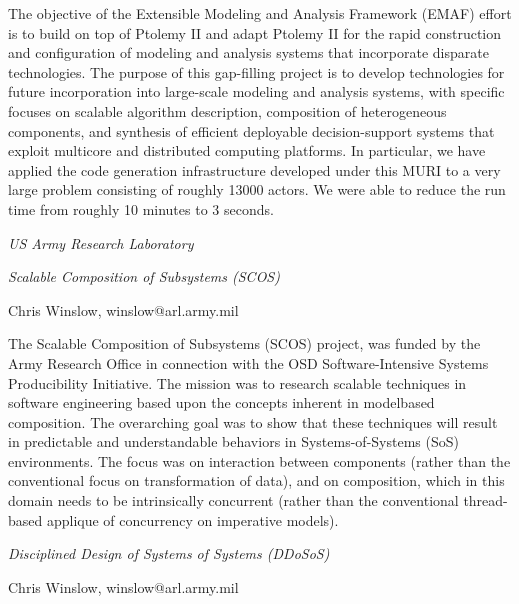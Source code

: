                  The objective of the Extensible Modeling and Analysis Framework (EMAF)
                 effort is to build on top of Ptolemy II and adapt Ptolemy II for the
                 rapid construction and configuration of modeling and analysis systems
                 that incorporate disparate technologies. The purpose of this
                 gap-filling project is to develop technologies for future
                 incorporation into large-scale modeling and analysis systems, with
                 specific focuses on scalable algorithm description, composition of
                 heterogeneous components, and synthesis of efficient deployable
                 decision-support systems that exploit multicore and distributed
                 computing platforms. In particular, we have applied the code
                 generation infrastructure developed under this MURI to a very large
                 problem consisting of roughly 13000 actors. We were able to reduce
                 the run time from roughly 10 minutes to 3 seconds.

                 \emph{US Army Research Laboratory}
                 
                 \noindent \emph{Scalable Composition of Subsystems (SCOS)}

                 Chris Winslow, winslow@arl.army.mil

                 The Scalable Composition of Subsystems (SCOS) project, was
                 funded by the Army Research Office in connection with the OSD
                 Software-Intensive Systems Producibility Initiative. The mission was
                 to research scalable techniques in software engineering based upon the
                 concepts inherent in modelbased composition. The overarching goal was
                 to show that these techniques will result in predictable and
                 understandable behaviors in Systems-of-Systems (SoS) environments. The
                 focus was on interaction between components (rather than the
                 conventional focus on transformation of data), and on composition,
                 which in this domain needs to be intrinsically concurrent (rather than
                 the conventional thread-based applique of concurrency on imperative
                 models).

                 \noindent \emph{Disciplined Design of Systems of Systems (DDoSoS)}

                 Chris Winslow, winslow@arl.army.mil

